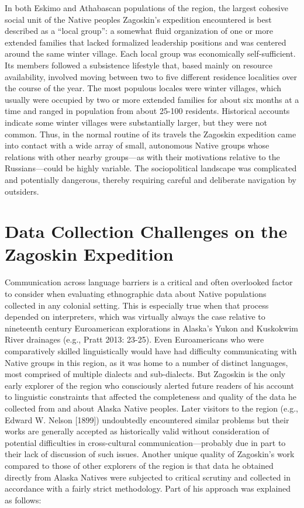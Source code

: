 In both Eskimo and Athabascan populations of the region, the largest cohesive social unit of the Native peoples Zagoskin’s expedition encountered is best described as a “local group”: a somewhat fluid organization of one or more extended families that lacked formalized leadership positions and was centered around the same winter village. Each local group was economically self-sufficient. Its members followed a subsistence lifestyle that, based mainly on resource availability, involved moving between two to five different residence localities over the course of the year. The most populous locales were winter villages, which usually were occupied by two or more extended families for about six months at a time and ranged in population from about 25-100 residents. Historical accounts indicate some winter villages were substantially larger, but they were not common. Thus, in the normal routine of its travels the Zagoskin expedition came into contact with a wide array of small, autonomous Native groups whose relations with other nearby groups—as with their motivations relative to the Russians—could be highly variable. The sociopolitical landscape was complicated and potentially dangerous, thereby requiring careful and deliberate navigation by outsiders.

\section*{Data Collection Challenges on the Zagoskin Expedition}
Communication across language barriers is a critical and often overlooked factor to consider when evaluating ethnographic data about Native populations collected in any colonial setting. This is especially true when that process depended on interpreters, which was virtually always the case relative to nineteenth century Euroamerican explorations in Alaska’s Yukon and Kuskokwim River drainages (e.g., Pratt 2013: 23-25). Even Euroamericans who were comparatively skilled linguistically would have had difficulty communicating with Native groups in this region, as it was home to a number of distinct languages, most comprised of multiple dialects and sub-dialects. But Zagoskin is the only early explorer of the region who consciously alerted future readers of his account to linguistic constraints that affected the completeness and quality of the data he collected from and about Alaska Native peoples. Later visitors to the region (e.g., Edward W. Nelson [1899]) undoubtedly encountered similar problems but their works are generally accepted as historically valid without consideration of potential difficulties in cross-cultural communication—probably due in part to their lack of discussion of such issues. Another unique quality of Zagoskin’s work compared to those of other explorers of the region is that data he obtained directly from Alaska Natives were subjected to critical scrutiny and collected in accordance with a fairly strict methodology. Part of his approach was explained as follows:


